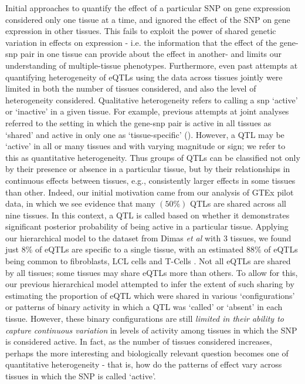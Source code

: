 Initial approaches to quantify the effect of a particular SNP on gene expression considered only one tissue at a time, and ignored the effect of the SNP on gene expression in other tissues.
This fails to exploit the power of  shared genetic variation in effects on expression - i.e. the information that the effect of the gene-snp pair in one tissue can provide about the effect in another- and limits our understanding of multiple-tissue phenotypes.
Furthermore, even past attempts at quantifying heterogeneity of eQTLs using the data across tissues jointly were limited in both the number of tissues considered, and also the level of heterogeneity considered. Qualitative heterogeneity refers to calling a snp `active' or `inactive' in a given tissue. For example, previous attempts at joint analyses referred to the setting in which the gene-snp pair is active in all tissues as `shared' and active in only one as `tissue-specific'  (\cite{flutre_statistical_2013,wen_bayesian_2014}).
However, a QTL may be `active' in all or many tissues and with varying magnitude or sign; we refer to this as quantitative heterogeneity. Thus groups of QTLs can be classified not only by their presence or absence in a particular tissue, but by their relationships in continuous effects between tissues, e.g., consistently larger effects in some tissues than other.
 Indeed, our initial motivation came from our analysis of GTEx pilot data, in which we see evidence that many $(50\%)$ QTLs are shared across all nine tissues. In this context, a QTL is called based on whether it demonstrates significant posterior probability of being active in a particular tissue. Applying our hierarchical model to the dataset from Dimas {\it et al} \cite{dimas_common_2009} with 3 tissues, we found just 8\% of eQTLs are specific to a single tissue, with an estimated 88\% of eQTLs being common to fibroblasts, LCL cells and T-Cells \cite{flutre_statistical_2013}. Not all eQTLs are shared by all tissues; some tissues may share eQTLs more than others. To allow for this, our previous hierarchical model attempted to infer the extent of such sharing by estimating the proportion of eQTL which were shared in various `configurations' or patterns of binary activity in which a QTL was `called' or `absent' in each tissue.
 However, these binary configurations are still \textit{limited in their ability to capture continuous variation} in levels of activity among tissues in which the SNP is considered active. 
 In fact, as the number of tissues considered increases, perhaps the more interesting and biologically relevant question becomes one of quantitative heterogeneity - that is, how do the patterns of effect vary across tissues in which the SNP is called `active'.  
